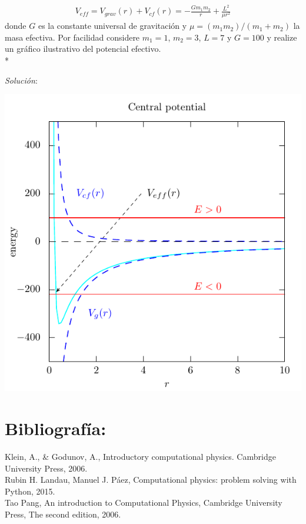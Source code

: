 \documentclass[11.5pt,a4paper]{article}
\begin{document}
\begin{eqnarray*}
V_{eff} = V_{grav}(r)+V_{cf}(r)=-\frac{G m_1 m_2}{r}+\frac{L^2}{\mu r^2}
\end{eqnarray*}
donde $G$ es la constante universal de gravitación y $\mu = (m_1 m_2)/(m_1+m_2)$ la masa efectiva. Por facilidad considere $m_1=1$, $m_2=3$, $L=7$ y $G=100$ y realize un gráfico ilustrativo del potencial efectivo.\\*

\textit{Solución}:

\includegraphics[scale=0.75]{ejercicio2.pdf}\\






\section{Bibliografía:}

Klein, A., \& Godunov, A., Introductory computational physics. Cambridge University Press, 2006.\\

Rubin H. Landau, Manuel J. Páez, Computational physics: problem solving with Python, 2015.\\

Tao Pang, An introduction to Computational Physics, Cambridge University Press, The
second edition, 2006.
\end{document}
